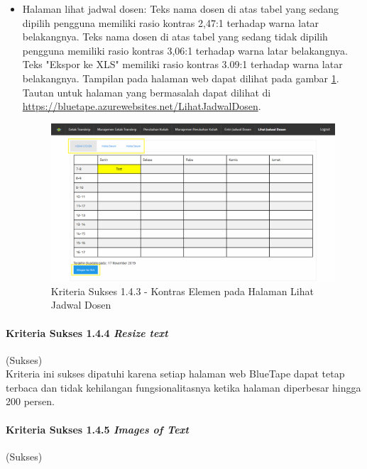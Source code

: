 \documentclass[a4paper,twoside]{article}
\begin{document}
\begin{enumerate}
\begin{itemize}
			\item Halaman lihat jadwal dosen: Teks nama dosen di atas tabel yang sedang dipilih pengguna memiliki rasio kontras 2,47:1 terhadap warna latar belakangnya. Teks nama dosen di atas tabel yang sedang tidak dipilih pengguna memiliki rasio kontras 3,06:1 terhadap warna latar belakangnya. Teks "Ekspor ke XLS" memiliki rasio kontras 3.09:1 terhadap warna latar belakangnya. Tampilan pada halaman web dapat dilihat pada gambar \ref{fig:1.4.3_contrast_minimum_7}. Tautan untuk halaman yang bermasalah dapat dilihat di \url{https://bluetape.azurewebsites.net/LihatJadwalDosen}.
			\begin{figure}[H]
				\centering  
				\includegraphics[scale=0.3, frame]{kriteria-sukses-1-4-3-contrast-minimum-7}  
				\caption[Kriteria Sukses 1.4.3 - Kontras Elemen pada Halaman Lihat Jadwal Dosen]{Kriteria Sukses 1.4.3 - Kontras Elemen pada Halaman Lihat Jadwal Dosen}
				\label{fig:1.4.3_contrast_minimum_7}  
			\end{figure} 
		\end{itemize}

		\paragraph{Kriteria Sukses 1.4.4 \textit{Resize text}}
		\label{par:kepatuhan_bluetape_kriteria_sukses_1.4.4}
		(Sukses)\\

		Kriteria ini sukses dipatuhi karena setiap halaman web BlueTape dapat tetap terbaca dan tidak kehilangan fungsionalitasnya ketika halaman diperbesar hingga 200 persen. 

		\paragraph{Kriteria Sukses 1.4.5 \textit{Images of Text}}
		\label{par:kepatuhan_bluetape_kriteria_sukses_1.4.5}
		(Sukses)\\


\end{enumerate}
\end{document}
